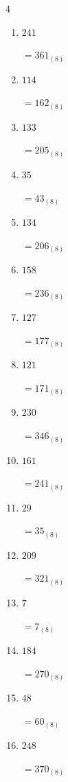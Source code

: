 \begin{multicols}{4}
\begin{enumerate}
        $=373_{(8)}$

  \item $241$

        $=361_{(8)}$

  \item $114$

        $=162_{(8)}$

  \item $133$

        $=205_{(8)}$

  \item $35$

        $=43_{(8)}$

  \item $134$

        $=206_{(8)}$

  \item $158$

        $=236_{(8)}$

\columnbreak %

  \item $127$

        $=177_{(8)}$

  \item $121$

        $=171_{(8)}$

  \item $230$

        $=346_{(8)}$

  \item $161$

        $=241_{(8)}$

  \item $29$

        $=35_{(8)}$

  \item $209$

        $=321_{(8)}$

  \item $7$

        $=7_{(8)}$

  \item $184$

        $=270_{(8)}$

  \item $48$

        $=60_{(8)}$

  \item $248$

        $=370_{(8)}$


\end{enumerate}
\end{multicols}
